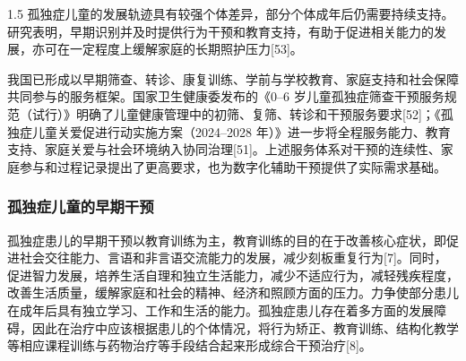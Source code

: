 \documentclass[zihao=-4]{ctexart}
\begin{document}
\begin{spacing}{1.5}
孤独症儿童的发展轨迹具有较强个体差异，部分个体成年后仍需要持续支持。研究表明，早期识别并及时提供行为干预和教育支持，有助于促进相关能力的发展，亦可在一定程度上缓解家庭的长期照护压力[53]。

我国已形成以早期筛查、转诊、康复训练、学前与学校教育、家庭支持和社会保障共同参与的服务框架。国家卫生健康委发布的《0--6 岁儿童孤独症筛查干预服务规范（试行）》明确了儿童健康管理中的初筛、复筛、转诊和干预服务要求[52]；《孤独症儿童关爱促进行动实施方案（2024--2028 年）》进一步将全程服务能力、教育支持、家庭关爱与社会环境纳入协同治理[51]。上述服务体系对干预的连续性、家庭参与和过程记录提出了更高要求，也为数字化辅助干预提供了实际需求基础。

\subsubsection{孤独症儿童的早期干预}

孤独症患儿的早期干预以教育训练为主，教育训练的目的在于改善核心症状，即促进社会交往能力、言语和非言语交流能力的发展，减少刻板重复行为[7]。同时，促进智力发展，培养生活自理和独立生活能力，减少不适应行为，减轻残疾程度，改善生活质量，缓解家庭和社会的精神、经济和照顾方面的压力。力争使部分患儿在成年后具有独立学习、工作和生活的能力。孤独症患儿存在着多方面的发展障碍，因此在治疗中应该根据患儿的个体情况，将行为矫正、教育训练、结构化教学等相应课程训练与药物治疗等手段结合起来形成综合干预治疗[8]。


\end{spacing}
\end{document}
